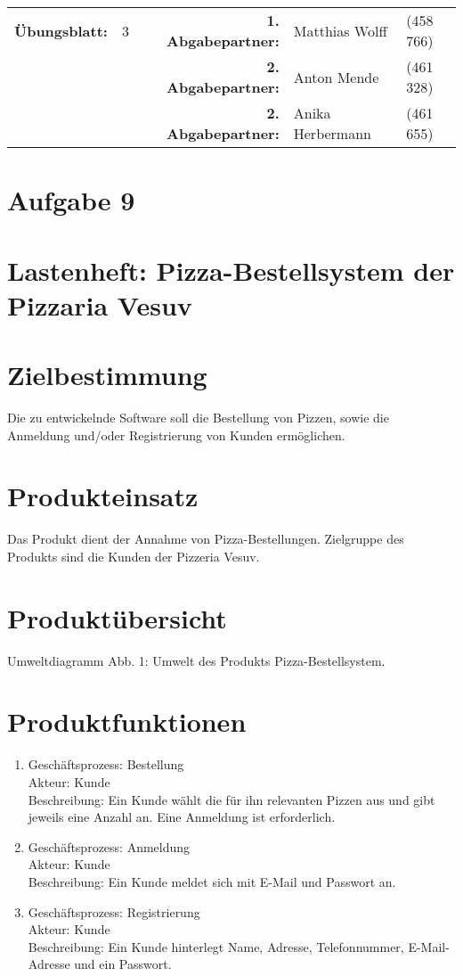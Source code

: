 \newcommand{\obenlinks}{Software Engineering}		%

\usepackage{float}


	\begin{center}
		\begin{tabular}{|rlp{4cm}rll|}
		\hline
		 \textbf{Übungsblatt:} & 3 &   & \textbf{1. Abgabepartner:} & Matthias Wolff & (458 766)  \\
		        & & & \textbf{2. Abgabepartner:} & Anton Mende & (461 328) \\
		        & & & \textbf{2. Abgabepartner:} & Anika Herbermann & (461 655) \\ \hline
		\end{tabular}
	\end{center}
\section*{Aufgabe 9}
\section*{Lastenheft: Pizza-Bestellsystem der Pizzaria Vesuv}
\section{Zielbestimmung}
Die zu entwickelnde Software soll die Bestellung von Pizzen, sowie die Anmeldung und/oder Registrierung von Kunden ermöglichen.
\section{Produkteinsatz}
Das Produkt dient der Annahme von Pizza-Bestellungen. Zielgruppe des Produkts sind die Kunden der Pizzeria Vesuv.
\section{Produktübersicht}
Umweltdiagramm
Abb. 1: Umwelt des Produkts Pizza-Bestellsystem.
\section{Produktfunktionen}
\begin{enumerate}[/LF10/]
	\item Geschäftsprozess: Bestellung\\
	Akteur: Kunde\\
	Beschreibung: Ein Kunde wählt die für ihn relevanten Pizzen aus und gibt jeweils eine Anzahl an. Eine Anmeldung ist erforderlich.
	\item Geschäftsprozess: Anmeldung\\
	Akteur: Kunde\\
	Beschreibung: Ein Kunde meldet sich mit E-Mail und Passwort an.
	\item Geschäftsprozess: Registrierung\\
	Akteur: Kunde\\
	Beschreibung: Ein Kunde hinterlegt Name, Adresse, Telefonnummer, E-Mail-Adresse und ein Passwort.
\end{enumerate}
